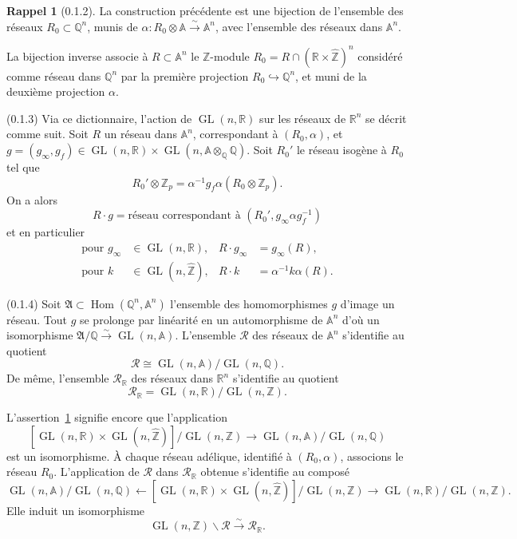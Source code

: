 \documentclass[11pt,a4paper]{amsart}
\theoremstyle{plain}
\theoremstyle{definition}
\newtheorem{rappel}[theorem]{Rappel}
\theoremstyle{remark}
\DeclareMathOperator{\Hom}{Hom}
\DeclareMathOperator{\GL}{GL}
\newcommand{\ZZ}{\mathbb{Z}}
\newcommand{\QQ}{\mathbb{Q}}
\newcommand{\RR}{\mathbb{R}}
\newcommand{\Af}{\mathbb{A}}
\newcommand{\cR}{\mathcal{R}}
\newcommand{\fA}{\mathfrak{A}}
\newcommand{\wh}{\widehat}
\newcommand{\bs}{\backslash}
\begin{document}
\begin{rappel}[0.1.2] \label{rappel:0.1.2}
La construction pr\'ec\'edente est une bijection de l'ensemble des r\'eseaux $R_0 \subset \QQ^n$, munis de $\alpha: R_0 \otimes \Af \xrightarrow{\sim} \Af^n$, avec l'ensemble des r\'eseaux dans $\Af^n$.

La bijection inverse associe \`a $R \subset \Af^n$ le $\ZZ$-module $R_0 = R \cap (\RR \times \wh{\ZZ})^n$ consid\'er\'e comme r\'eseau dans $\QQ^n$ par la premi\`ere projection $R_0 \hookrightarrow \QQ^n$, et muni de la deuxi\`eme projection $\alpha$.
\end{rappel}

(0.1.3) Via ce dictionnaire, l'action de $\GL(n,\RR)$ sur les r\'eseaux de $\RR^n$ se d\'ecrit comme suit. Soit $R$ un r\'eseau dans $\Af^n$, correspondant \`a $(R_0, \alpha)$, et $g = (g_\infty, g_f) \in \GL(n,\RR) \times \GL(n, \Af \otimes_{\QQ} \QQ)$. Soit $R_0'$ le r\'eseau isog\`ene \`a $R_0$ tel que
\[ R_0' \otimes \ZZ_p = \alpha^{-1} g_f \alpha(R_0 \otimes \ZZ_p). \]
On a alors
\[ R \cdot g = \text{r\'eseau correspondant \`a } (R_0', g_\infty \alpha g_f^{-1}) \]
et en particulier
\begin{align*}
\text{pour } g_\infty &\in \GL(n,\RR), & R \cdot g_\infty &= g_\infty(R), \\
\text{pour } k &\in \GL(n,\wh{\ZZ}), & R \cdot k &= \alpha^{-1} k \alpha(R).
\end{align*}

(0.1.4) Soit $\fA \subset \Hom(\QQ^n, \Af^n)$ l'ensemble des homomorphismes $g$ d'image un r\'eseau. Tout $g$ se prolonge par lin\'earit\'e en un automorphisme de $\Af^n$ d'o\`u un isomorphisme $\fA/\QQ \xrightarrow{\sim} \GL(n,\Af)$. L'ensemble $\cR$ des r\'eseaux de $\Af^n$ s'identifie au quotient
\[ \cR \cong \GL(n,\Af)/\GL(n,\QQ). \]
De m\^eme, l'ensemble $\cR_\RR$ des r\'eseaux dans $\RR^n$ s'identifie au quotient
\[ \cR_\RR = \GL(n,\RR)/\GL(n,\ZZ). \]

L'assertion~\ref{rappel:0.1.2} signifie encore que l'application
\begin{equation} \label{eq:0.1.4.1}
[\GL(n,\RR) \times \GL(n,\wh{\ZZ})]/\GL(n,\ZZ) \longrightarrow \GL(n,\Af)/\GL(n,\QQ)
\end{equation}
est un isomorphisme. \`A chaque r\'eseau ad\'elique, identifi\'e \`a $(R_0,\alpha)$, associons le r\'eseau $R_0$. L'application de $\cR$ dans $\cR_\RR$ obtenue s'identifie au compos\'e
\[ \GL(n,\Af)/\GL(n,\QQ) \leftarrow [\GL(n,\RR) \times \GL(n,\wh{\ZZ})]/\GL(n,\ZZ) \longrightarrow \GL(n,\RR)/\GL(n,\ZZ). \]
Elle induit un isomorphisme
\begin{equation} \label{eq:0.1.4.2}
\GL(n,\ZZ)\bs\cR \xrightarrow{\sim} \cR_\RR.
\end{equation}
\end{document}
